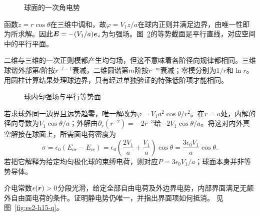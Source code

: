 \begin{figure}[H]\centering
{}
\caption{球面的一次角电势}\label{fig:es2-h14-q}
\end{figure}
\begin{solution}
函数$z=r\cos\theta$在三维中调和，故$\varphi=V_1z/a$在球内正则并满足边界，由唯一性即为所求解。因此$\bm{E}=-(V_1/a)\bm{e}_z$为匀强场。图~\ref{fig:es2-h14-s}的等势截面是平行直线，对应空间中的平行平面。

二维与三维的一次正则模都产生均匀场，但这不意味着各阶径向规律都相同。三维球谐外部第$l$阶按$r^{-l-1}$衰减，二维圆谐第$m$阶按$r^{-m}$衰减；零模分别为$1/r$和$\ln r$。用圆柱计算结果处理球边界，只有经过单独验证的特殊低阶项才能相同。
\begin{figure}[H]\centering
{}
\caption{球内匀强场与平行等势面}\label{fig:es2-h14-s}
\end{figure}


若求球外同一边界且远势趋零，唯一解改为$\varphi=V_1a^2\cos\theta/r^2$。在$r=a$处，内解的径向导数为$V_1\cos\theta/a$；外解由$\partial_r(r^{-2})=-2r^{-3}$给$-2V_1\cos\theta/a$。将这对内外真空解接在球面上，所需面电荷密度为
\[\sigma=\epsilon_0(E_{or}-E_{ir})
=\epsilon_0\left(\frac{2V_1}{a}+\frac{V_1}{a}\right)\cos\theta
=\frac{3\epsilon_0V_1}{a}\cos\theta.\]
若把它解释为给定均匀极化球的束缚电荷，则对应$P=3\epsilon_0V_1/a$；球面本身并非等势导体。
\end{solution}

\begin{exercise}[非均匀介质中的唯一性]\label{ex:es2-h15}
介电常数$\epsilon(\bm{r})>0$分段光滑，给定全部自由电荷及外边界电势，内部界面满足无额外自由面电荷的条件。证明静电势仍唯一，并指出界面项如何抵消。 见图~\ref{fig:es2-h15-q}。
\end{exercise}

